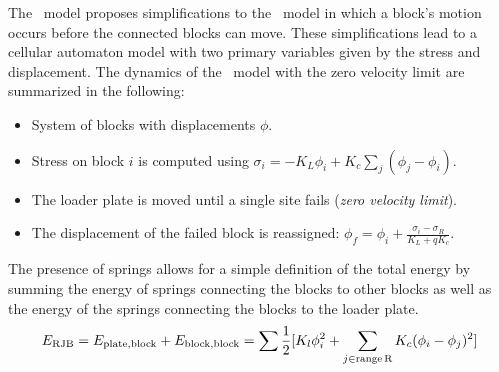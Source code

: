 The \rjb\ model proposes simplifications to the \bk\ model in which a block's motion occurs before the connected blocks can move. These simplifications lead to a cellular automaton model with two primary variables given by the stress and displacement. The dynamics of the \rjb\ model with the zero velocity limit are summarized in the following:    %
\begin{itemize}
	\item System of blocks with displacements $\phi$.
	\item Stress on block $i$ is computed using  $ \sigma_i = -K_L \phi_i + K_c \sum_j (\phi_j-\phi_i) $.		
	\item The loader plate is moved until a single site fails (\emph{zero velocity limit}). 
	
	\item The displacement of the failed block  is reassigned:    
				$ \phi_f = \phi_i + \frac{\sigma_i - \sigma_R}{K_L +  qK_c}  $.
\end{itemize}
The presence of springs allows for a simple definition of the total energy by summing the energy of springs connecting the blocks to  other blocks as well as the energy of the springs connecting the blocks to the loader plate.  %
\begin{equation}
 	\label{eq:rjbenergy}
	E_{\rm RJB} = E_{\rm plate,block}+E_{\rm block,block} =\sum \frac{1}{2} [ K_l \phi_i^2 + \sum_{j\in \rm range\, R } K_c (\phi_i-\phi_j)^2 ]
\end{equation}  %
				 
